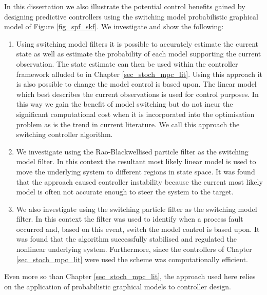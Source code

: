 In this dissertation we also illustrate the potential control benefits gained by designing predictive controllers using the switching model probabilistic graphical model of Figure \ref{fig_spf_skf}. We investigate and show the following:
\begin{enumerate}
\item
Using switching model filters it is possible to accurately estimate the current state as well as estimate the probability of each model supporting the current observation. The state estimate can then be used within the controller framework alluded to in Chapter \ref{sec_stoch_mpc_lit}. Using this approach it is also possible to change the model control is based upon. The linear model which best describes the current observations is used for control purposes. In this way we gain the benefit of model switching but do not incur the significant computational cost when it is incorporated into the optimisation problem as is the trend in current literature. We call this approach the switching controller algorithm.
\item
We investigate using the Rao-Blackwellised particle filter as the switching model filter. In this context the resultant most likely linear model is used to move the underlying system to different regions in state space. It was found that the approach caused controller instability because the current most likely model is often not accurate enough to steer the system to the target.
\item
We also investigate using the switching particle filter as the switching model filter. In this context the filter was used to identify when a process fault occurred and, based on this event, switch the model control is based upon. It was found that the algorithm successfully stabilised and regulated the nonlinear underlying system. Furthermore, since the controllers of Chapter \ref{sec_stoch_mpc_lit} were used the scheme was computationally efficient.
\end{enumerate}
Even more so than Chapter \ref{sec_stoch_mpc_lit}, the approach used here relies on the application of probabilistic graphical models to controller design.  
